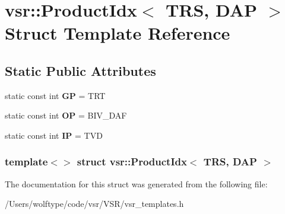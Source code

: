 \hypertarget{structvsr_1_1_product_idx_3_01_t_r_s_00_01_d_a_p_01_4}{\section{vsr\-:\-:Product\-Idx$<$ T\-R\-S, D\-A\-P $>$ Struct Template Reference}
\label{structvsr_1_1_product_idx_3_01_t_r_s_00_01_d_a_p_01_4}
}
\subsection*{Static Public Attributes}
\begin{DoxyCompactItemize}
\item 
\hypertarget{structvsr_1_1_product_idx_3_01_t_r_s_00_01_d_a_p_01_4_ab76d6b19fe185e8e347e49cd42f9e110}{static const int {\bfseries G\-P} = T\-R\-T}\label{structvsr_1_1_product_idx_3_01_t_r_s_00_01_d_a_p_01_4_ab76d6b19fe185e8e347e49cd42f9e110}

\item 
\hypertarget{structvsr_1_1_product_idx_3_01_t_r_s_00_01_d_a_p_01_4_afe83b11da56232ec0e861f5dbe4a1589}{static const int {\bfseries O\-P} = B\-I\-V\-\_\-\-D\-A\-F}\label{structvsr_1_1_product_idx_3_01_t_r_s_00_01_d_a_p_01_4_afe83b11da56232ec0e861f5dbe4a1589}

\item 
\hypertarget{structvsr_1_1_product_idx_3_01_t_r_s_00_01_d_a_p_01_4_a04d20ad12f1c9065e4728e1eb3fc5461}{static const int {\bfseries I\-P} = T\-V\-D}\label{structvsr_1_1_product_idx_3_01_t_r_s_00_01_d_a_p_01_4_a04d20ad12f1c9065e4728e1eb3fc5461}

\end{DoxyCompactItemize}
\subsubsection*{template$<$$>$ struct vsr\-::\-Product\-Idx$<$ T\-R\-S, D\-A\-P $>$}



The documentation for this struct was generated from the following file\-:\begin{DoxyCompactItemize}
\item 
/\-Users/wolftype/code/vsr/\-V\-S\-R/vsr\-\_\-templates.\-h\end{DoxyCompactItemize}
